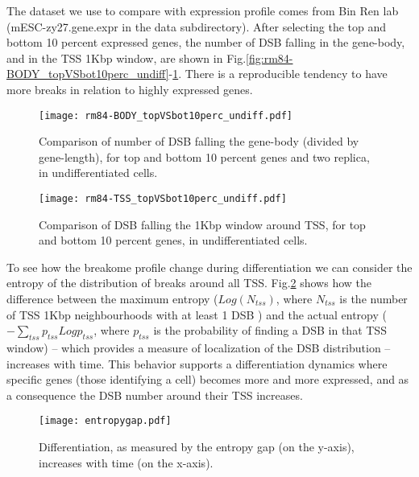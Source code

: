 \documentclass[11pt,a4paper]{article}
\begin{document}
The dataset we use to compare with expression profile comes from Bin Ren lab (mESC-zy27.gene.expr in the data subdirectory). After selecting the top and bottom 10 percent expressed genes, the number of DSB falling in the gene-body, and in the TSS 1Kbp window, are shown in Fig.\ref{fig:rm84-BODY_topVSbot10perc_undiff}-\ref{fig:rm84-TSS_topVSbot10perc_undiff}. There is a reproducible tendency to have more breaks in relation to highly expressed genes.

\begin{figure}[hbtp]
\begin{minipage}[t]{0.45\textwidth}
\texttt{[image: rm84-BODY\_topVSbot10perc\_undiff.pdf]}
\caption{Comparison of number of DSB falling the gene-body (divided by gene-length), for top and bottom 10 percent genes and two replica, in undifferentiated cells.}
\label{fig:rm84-BODY_topVSbot10perc_undiff}
\end{minipage}
\hspace{\fill}
\begin{minipage}[t]{0.45\textwidth}
\texttt{[image: rm84-TSS\_topVSbot10perc\_undiff.pdf]}
\caption{Comparison of DSB falling the 1Kbp window around TSS, for top and bottom 10 percent genes, in undifferentiated cells.}
\label{fig:rm84-TSS_topVSbot10perc_undiff}
\end{minipage}
\end{figure}

To see how the breakome profile change during differentiation we can 
consider the entropy of the distribution of breaks around all TSS. Fig.\ref{fig:entropygap} shows how the difference between the maximum entropy ($Log(N_{tss})$, where $N_{tss}$ is the number of TSS 1Kbp neighbourhoods with at least 1 DSB ) and the actual entropy ($-\sum_{tss} p_{tss}Log p_{tss}$, where $p_{tss}$ is the probability of finding a DSB in that TSS window) -- which provides a measure of localization of the DSB distribution -- increases with time. This 
behavior supports a differentiation dynamics where specific genes (those identifying a cell) becomes more and more expressed, and as a consequence the DSB number around their TSS increases.

\begin{figure}[hbtp]
\centering
\texttt{[image: entropygap.pdf]}
\caption{Differentiation, as measured by the entropy gap (on the y-axis), increases with time (on the x-axis).}
\label{fig:entropygap}
\end{figure}
\end{document}
